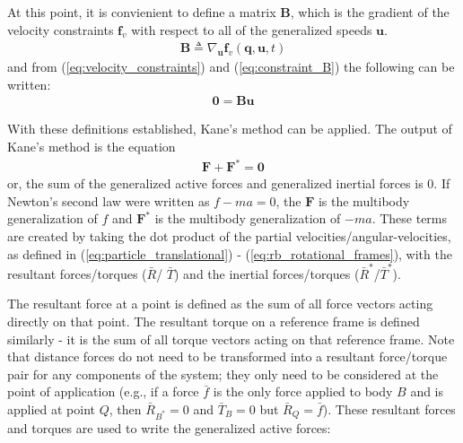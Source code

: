 \documentclass[smallcondensed,final]{svjour3}                     %
\begin{document}
At this point, it is convienient to define a matrix $\mathbf{B}$, which is the
gradient of the velocity constraints $\mathbf{f}_v$ with respect to all of the
generalized speeds $\mathbf{u}$.
\begin{align}
\label{eq:constraint_B}
\mathbf{B} \triangleq \nabla_{\mathbf{u}} \mathbf{f}_v (\mathbf{q}, \mathbf{u},
t)
\end{align}
and from (\ref{eq:velocity_constraints}) and (\ref{eq:constraint_B}) the
following can be written:
\begin{align}
\label{eq:constraint_Bu0}
\mathbf{0} = \mathbf{B}\mathbf{u}
\end{align}

With these definitions established, Kane's method can be applied.
The output of Kane's method is the equation
\begin{align}
\label{eq:kanes_eq}
\mathbf{F} + \mathbf{F}^* = \mathbf{0}
\end{align}
or, the sum of the generalized active forces and generalized inertial forces is
0.
If Newton's second law were written as $f - ma = 0$, the $\mathbf{F}$ is the
multibody generalization of $f$ and $\mathbf{F}^*$ is the multibody
generalization of $-ma$.
These terms are created by taking the dot product of the partial
velocities/angular-velocities, as defined in (\ref{eq:particle_translational})
- (\ref{eq:rb_rotational_frames}), with the resultant forces/torques ($\bar{R}$/
$\bar{T}$) and the inertial forces/torques ($\bar{R}^*$/$\bar{T}^*$).

The resultant force at a point is defined as the sum of all force vectors
acting directly on that point.
The resultant torque on a reference frame is defined similarly - it is the sum
of all torque vectors acting on that reference frame.
Note that distance forces do not need to be transformed into a resultant
force/torque pair for any components of the system; they only need to be
considered at the point of application (e.g., if a force $\bar{f}$ is the only
force applied to body $B$ and is applied at point $Q$, then $\bar{R}_{B^*}=0$
and $\bar{T}_B=0$ but $\bar{R}_Q=\bar{f}$).
These resultant forces and torques are used to write the generalized active
forces:
\end{document}
